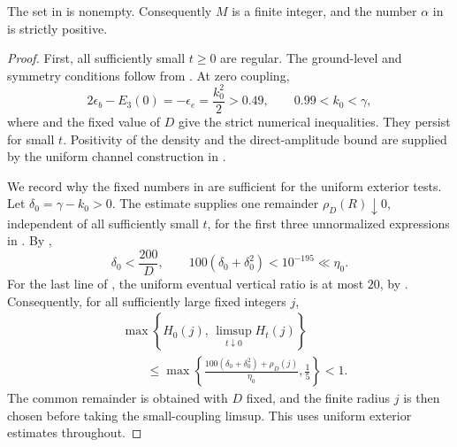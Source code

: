 \begin{lemma}
\label{lem:parameter-radius}
The set in  is nonempty.
Consequently \(M\) is a finite integer, and the number \(\alpha\)
in  is strictly positive.
\end{lemma}

\begin{proof}
First, all sufficiently small \(t\ge0\) are regular.
The ground-level and symmetry conditions follow from
.  At zero coupling,
\[
 2\epsilon_b-E_3(0)=-\epsilon_e=\frac{k_0^2}{2}>0.49,
 \qquad 0.99<k_0<\gamma,
\]
where  and the fixed value of \(D\)
give the strict numerical inequalities.  They persist for small
\(t\).  Positivity of the density and the direct-amplitude bound
are supplied by the uniform channel construction in
.

We record why the fixed numbers in
 are sufficient for the uniform
exterior tests.  Let \(\delta_0=\gamma-k_0>0\).
The estimate  supplies one
remainder \(\rho_D(R)\downarrow0\), independent of all sufficiently
small \(t\), for the first three unnormalized expressions in
.  By ,
\begin{equation}
 \delta_0<\frac{200}{D},\qquad
 100(\delta_0+\delta_0^2)<10^{-195}\ll\eta_0 .
 \label{eq:parameter-drift-slack}
\end{equation}
For the last line of , the uniform eventual
vertical ratio is at most \(20\), by .
Consequently, for all sufficiently large fixed integers \(j\),
\[
 \begin{split}
 &\max\left\{H_0(j),\,\limsup_{t\downarrow0}H_t(j)\right\}\\
 &\qquad\le
 \max\left\{
   \frac{100(\delta_0+\delta_0^2)+\rho_D(j)}{\eta_0},
   \frac15\right\}<1.
 \end{split}
\]
The common remainder is obtained with \(D\) fixed, and the finite
radius \(j\) is then chosen before taking the small-coupling
limsup.  This uses uniform exterior estimates throughout.


\end{proof}
